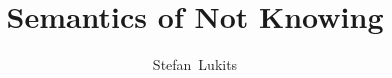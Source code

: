 \documentclass[journal]{IEEEtran}
\begin{document}
%
\title{Semantics of Not Knowing}
%
%
%

\author{Stefan~Lukits}%

% 
%



% 
\end{document}

